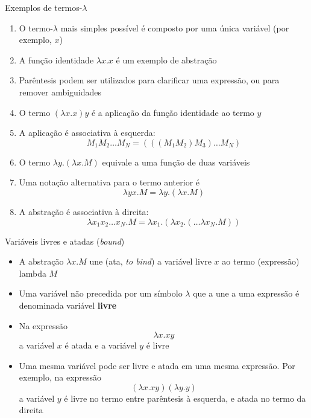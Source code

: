 \begin{frame}[fragile]{Exemplos de termos-$\lambda$}

    \begin{enumerate}
        \item O termo-$\lambda$ mais simples possível é composto por uma única variável (por 
            exemplo, $x$)

        \item A função identidade $\lambda x.x$ é um exemplo de abstração

        \item Parêntesis podem ser utilizados para clarificar uma expressão, ou para remover
            ambiguidades

        \item O termo $(\lambda x.x)y$ é a aplicação da função identidade ao termo $y$

        \item A aplicação é associativa à esquerda:
        \[
            M_1M_2\ldots M_N = (((M_1M_2)M_3)\ldots M_N)
        \]

        \item O termo $\lambda y.(\lambda x.M)$ equivale a uma função de duas variáveis

        \item Uma notação alternativa para o termo anterior é 
        \[
            \lambda yx.M = \lambda y.(\lambda x.M)
        \]

        \item A abstração é associativa à direita:
        \[
            \lambda x_1x_2\ldots x_N.M = \lambda x_1.(\lambda x_2.(\ldots \lambda x_N.M))
        \]
    \end{enumerate}

\end{frame}

\begin{frame}[fragile]{Variáveis livres e atadas ({\it bound})}

    \begin{itemize}
        \item A abstração $\lambda x.M$ une (ata, \textit{to bind}) a variável livre $x$ ao
            termo (expressão) lambda $M$

        \item Uma variável não precedida por um símbolo $\lambda$ que a une a uma expressão
            é denominada variável \textbf{livre}

        \item Na expressão 
        \[
            \lambda x.xy
        \]
        a variável $x$ é atada e a variável $y$ é livre

        \item Uma mesma variável pode ser livre e atada em uma mesma expressão. Por exemplo,
            na expressão
        \[
            (\lambda x.xy)(\lambda y.y)
        \]
        a variável $y$ é livre no termo entre parêntesis à esquerda, e atada no termo da direita

    \end{itemize}

\end{frame}

